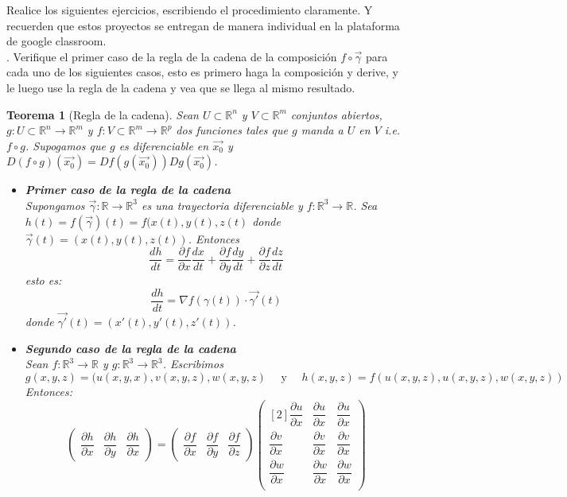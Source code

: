 \documentclass[letterpaper]{article}
\renewcommand{\d}{\partial}
\newcommand{\R}{\mathds{R}}
\renewcommand{\*}{\cdot}
\newtheorem{theorem}{Teorema}[]
\theoremstyle{definition}
\begin{document}
\noindent Realice los siguientes ejercicios, escribiendo el procedimiento claramente. Y recuerden que estos proyectos se entregan de manera individual en la plataforma de google classroom.\\


.  Verifique el primer caso de la regla de la cadena de la composición $ f\circ \vec{\gamma}$ para cada uno de los siguientes casos, esto es primero haga la composición y derive, y le luego use la regla de la cadena y vea que se llega al mismo resultado.\\
\begin{theorem}[Regla de la cadena]
	\relax
	Sean $ U\subset \R^n $ y $ V \subset \R^m $ conjuntos abiertos, $ g: U \subset \R^n \to \R^m $ y $ f: V\subset \R^m \to \R^p $ dos funciones tales que $ g $ manda a $ U $ en $ V $ \textit{i.e. } $ f \circ g $. Supogamos que $ g $ es diferenciable en $ \vec{x_0} $ y $ D(f \circ g) (\vec{x_0}) = Df(g(\vec{x_0}))Dg(\vec{x_0}) $.\\
	\begin{itemize}
		\item \textbf{Primer caso de la regla de la cadena}\\
		
		Supongamos $ \vec{\gamma}: \R \to \R^3 $ es una trayectoria diferenciable y $ f: \R^3 \to \R $. Sea $ h(t) = f(\vec{\gamma})(t) = f(x(t), y(t), z(t)  $ donde 
		$ \vec{\gamma}(t)= (x(t),y(t),z(t)) $. Entonces
		\[  \dfrac{dh}{dt} = \dfrac{\d f}{\d x} \dfrac{dx}{dt} +  \dfrac{\d f}{\d y} \dfrac{dy}{dt} +  \dfrac{\d f}{\d z} \dfrac{dz}{dt} \]
		esto es:
		\[ \dfrac{dh}{dt} = \nabla f(\gamma(t)) \* \vec{\gamma'}(t) \] donde $ \vec{\gamma'}(t)= (x'(t),y'(t),z'(t))  $.
		
		\item  \textbf{Segundo caso de la regla de la cadena }\\
		
		Sean $ f:\R^3 \to \R $ y $ g:\R^3 \to \R^3 $. Escribimos 
		\[ g(x,y,z) = (u(x,y,x), v(x,y,z), w(x,y,z) \quad \text{  y  }\quad h(x,y,z) = f(u(x,y,z), u(x,y,z), w(x,y,z))  \]
		Entonces:
	\[ \begin{pmatrix}
	\dfrac{\d h}{\d x} & \dfrac{\d h}{\d y} & \dfrac{\d h}{\d x}
	\end{pmatrix} = \begin{pmatrix}
	\dfrac{\d f}{\d x} & \dfrac{\d f}{\d y} & \dfrac{\d f}{\d z}
	\end{pmatrix} \begin{pmatrix}[2]
	\dfrac{\d u}{\d x} & \dfrac{\d u}{\d x} & \dfrac{\d u}{\d x}\\
	\dfrac{\d v}{\d x} & \dfrac{\d v}{\d x} & \dfrac{\d v}{\d x}\\
	\dfrac{\d w}{\d x} & \dfrac{\d w}{\d x} & \dfrac{\d w}{\d x}\\
	\end{pmatrix} \]
	\end{itemize}
\end{theorem}
\end{document}
